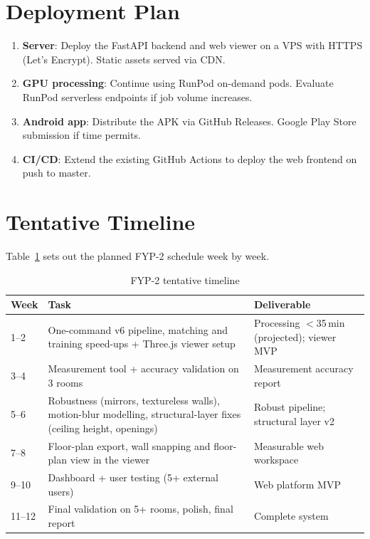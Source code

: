 \section{Deployment Plan}
\begin{enumerate}
    \item \textbf{Server}: Deploy the FastAPI backend and web viewer on a VPS with HTTPS (Let's Encrypt). Static assets served via CDN.
    \item \textbf{GPU processing}: Continue using RunPod on-demand pods. Evaluate RunPod serverless endpoints if job volume increases.
    \item \textbf{Android app}: Distribute the APK via GitHub Releases. Google Play Store submission if time permits.
    \item \textbf{CI/CD}: Extend the existing GitHub Actions to deploy the web frontend on push to master.
\end{enumerate}

\section{Tentative Timeline}

Table~\ref{tab:fyp2timeline} sets out the planned FYP-2 schedule week by week.

\begin{table}[htbp]
\centering
\small
\caption{FYP-2 tentative timeline}
\label{tab:fyp2timeline}
\begin{tabular}{p{2.5cm}p{5cm}p{3.5cm}}
\toprule
\textbf{Week} & \textbf{Task} & \textbf{Deliverable} \\
\midrule
1--2 & One-command v6 pipeline, matching and training speed-ups + Three.js viewer setup & Processing $<$35\,min (projected); viewer MVP \\
3--4 & Measurement tool + accuracy validation on 3 rooms & Measurement accuracy report \\
5--6 & Robustness (mirrors, textureless walls), motion-blur modelling, structural-layer fixes (ceiling height, openings) & Robust pipeline; structural layer v2 \\
7--8 & Floor-plan export, wall snapping and floor-plan view in the viewer & Measurable web workspace \\
9--10 & Dashboard + user testing (5+ external users) & Web platform MVP \\
11--12 & Final validation on 5+ rooms, polish, final report & Complete system \\
\bottomrule
\end{tabular}
\end{table}

